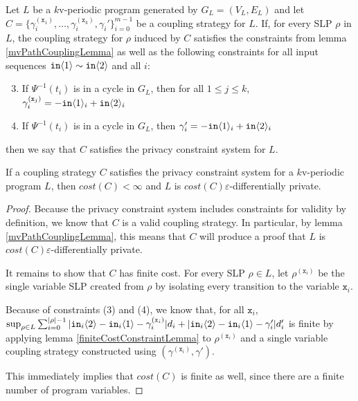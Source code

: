 \begin{defn}\label{mvPrivacyConstraintSystem}
    Let $L$ be a $k$v-periodic program generated by $G_L = (V_L, E_L)$ and let $C = \{\gamma_i^{(\texttt{x}_1)},\ldots, \gamma_i^{(\texttt{x}_k)}, \gamma_i'\}_{i=0}^{m-1}$ be a coupling strategy for $L$. If, for every SLP $\rho$ in $L$, the coupling strategy for $\rho$ induced by $C$ satisfies the constraints from lemma \ref{mvPathCouplingLemma} as well as the following constraints for all input sequences $\texttt{in}\langle1 \rangle\sim\texttt{in}\langle2 \rangle$ and all $i$: \begin{enumerate}
        \setcounter{enumi}{2}
        \item If $\Psi^{-1}(t_i)$ is in a cycle in $G_L$, then for all $1\leq j\leq k$, $\gamma_i^{(\texttt{x}_j)} = -\texttt{in}\langle1 \rangle_i+\texttt{in}\langle2 \rangle_i$
        \item If $\Psi^{-1}(t_i)$ is in a cycle in $G_L$, then $\gamma_i' = -\texttt{in}\langle1 \rangle_i+\texttt{in}\langle2 \rangle_i$
    \end{enumerate}
    then we say that $C$ satisfies the privacy constraint system for $L$. 
\end{defn}

\begin{lemma}
    If a coupling strategy $C$ satisfies the privacy constraint system for a $k$v-periodic program $L$, then $cost(C)<\infty$ and $L$ is $cost(C)\varepsilon$-differentially private. 
\end{lemma}

\begin{proof}
    Because the privacy constraint system includes constraints for validity by definition, we know that $C$ is a valid coupling strategy. In particular, by lemma \ref{mvPathCouplingLemma}, this means that $C$ will produce a proof that $L$ is $cost(C)\varepsilon$-differentially private. 
    
    It remains to show that $C$ has finite cost. For every SLP $\rho\in L$, let $\rho^{(\texttt{x}_i)}$ be the single variable SLP created from $\rho$ by isolating every transition to the variable $\texttt{x}_i$. 

    Because of constraints (3) and (4), we know that, for all $\texttt{x}_i$, $\sup_{\rho\in L}\sum_{i=0}^{|\rho|-1}|\texttt{in}_i\langle2 \rangle-\texttt{in}_i\langle1 \rangle-\gamma_i^{(\texttt{x}_i)}|d_i + |\texttt{in}_i\langle2 \rangle-\texttt{in}_i\langle1 \rangle-\gamma_i'|d_i'$ is finite by applying lemma \ref{finiteCostConstraintLemma} to $\rho^{(\texttt{x}_i)}$ and a single variable coupling strategy constructed using $(\gamma^{(\texttt{x}_i)}, \gamma')$. 

    This immediately implies that $cost(C)$ is finite as well, since there are a finite number of program variables. 
\end{proof}

